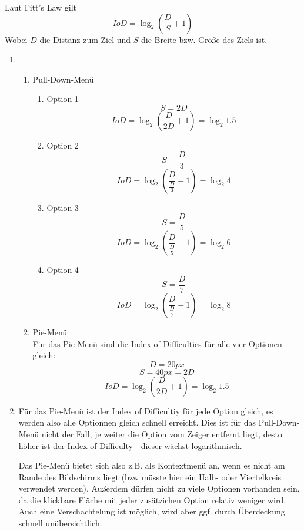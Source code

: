 \documentclass[a4paper,10pt]{article}
\begin{document}
\kopf
\renewcommand{\figurename}{Figure}

Laut Fitt's Law gilt
\[
	IoD = \log_2{\left(\frac{D}{S} + 1 \right)}
\]
Wobei $D$ die Distanz zum Ziel und $S$ die Breite bzw. Größe des Ziels ist.
\begin{enumerate}
	\item 
		\begin{enumerate}
			\item Pull-Down-Menü
			\begin{enumerate}
				\item Option 1
				 	\[ S = 2D \]
					\[ IoD = \log_2{\left(\frac{D}{2D} + 1 \right) = \log_2{1.5}}\]
				\item Option 2
				    \[ S = \frac{D}{3} \]	
				    \[ IoD = \log_2{\left(\frac{D}{\frac{D}{3}} + 1 \right)} = \log_2{4} \]
				\item Option 3
					\[ S = \frac{D}{5} \]
					\[ IoD = \log_2{\left(\frac{D}{\frac{D}{5}} + 1 \right)} = \log_2{6} \]
				\item Option 4
					\[ S = \frac{D}{7} \]
					\[ IoD = \log_2{\left(\frac{D}{\frac{D}{7}} + 1 \right)} = \log_2{8} \]
			\end{enumerate}
				
			\item Pie-Menü\\
				Für das Pie-Menü sind die Index of Difficulties für alle vier Optionen gleich:
				\[ D = 20px \]
				\[ S = 40px = 2D \]
				\[ IoD = \log_2{\left(\frac{D}{2D} + 1 \right) = \log_2{1.5}}\]
				
			
		\end{enumerate}
	\item
		Für das Pie-Menü ist der Index of Difficultiy für jede Option gleich, es werden also alle Optionnen gleich schnell erreicht.
		Dies ist für das Pull-Down-Menü nicht der Fall, je weiter die Option vom Zeiger entfernt liegt, desto höher ist der Index of Difficulty - dieser wächst logarithmisch. 
		
		Das Pie-Menü bietet sich also z.B. als Kontextmenü an, wenn es nicht am Rande des Bildschirms liegt (bzw müsste hier ein Halb- oder Viertelkreis verwendet werden).
		Außerdem dürfen nicht zu viele Optionen vorhanden sein, da die klickbare Fläche mit jeder zusätzichen Option relativ weniger wird.
		Auch eine Verschachtelung ist möglich, wird aber ggf. durch Überdeckung schnell unübersichtlich.
\end{enumerate}
\end{document}
